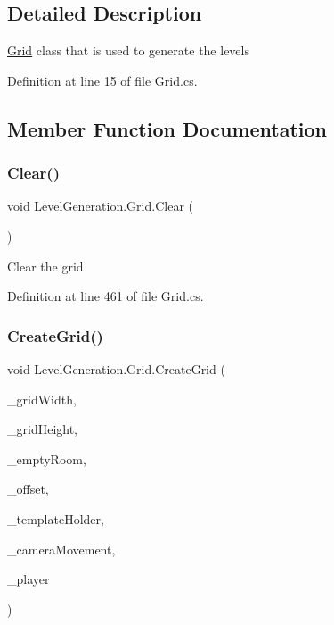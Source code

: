 \subsection{Detailed Description}
\mbox{\hyperlink{class_level_generation_1_1_grid}{Grid}} class that is used to generate the levels 



Definition at line 15 of file Grid.\+cs.



\subsection{Member Function Documentation}
\mbox{\label{class_level_generation_1_1_grid_a7ff44c0b5eeb4cc035b35f244089f33d}} 
\subsubsection{\texorpdfstring{Clear()}{Clear()}}
{\footnotesize\ttfamily void Level\+Generation.\+Grid.\+Clear (\begin{DoxyParamCaption}{ }\end{DoxyParamCaption})}



Clear the grid 



Definition at line 461 of file Grid.\+cs.

\mbox{\label{class_level_generation_1_1_grid_aafba1625abf1acd433a19d7b82c00ae2}} 
\subsubsection{\texorpdfstring{Create\+Grid()}{CreateGrid()}}
{\footnotesize\ttfamily void Level\+Generation.\+Grid.\+Create\+Grid (\begin{DoxyParamCaption}\item[{int}]{\+\_\+grid\+Width,  }\item[{int}]{\+\_\+grid\+Height,  }\item[{Game\+Object}]{\+\_\+empty\+Room,  }\item[{Vector2}]{\+\_\+offset,  }\item[{\mbox{\hyperlink{class_level_generation_1_1_template_holder}{Template\+Holder}}}]{\+\_\+template\+Holder,  }\item[{\mbox{\hyperlink{class_camera_movement}{Camera\+Movement}}}]{\+\_\+camera\+Movement,  }\item[{Game\+Object}]{\+\_\+player }\end{DoxyParamCaption})}



